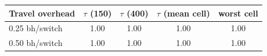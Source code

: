 \begin{tabular}{lcccc}
\toprule
Travel overhead & $\tau$ (150) & $\tau$ (400) & $\tau$ (mean cell) & worst cell \\
\midrule
0.25 bh/switch & 1.00 & 1.00 & 1.00 & 1.00 \\
0.50 bh/switch & 1.00 & 1.00 & 1.00 & 1.00 \\
\bottomrule
\end{tabular}
